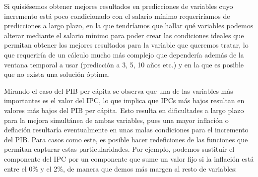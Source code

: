 \documentclass[11pt]{article}
\begin{document}
Si quisiésemos obtener mejores resultados en predicciones de variables
cuyo incremento está poco condicionado con el salario mínimo
requeriríamos de predicciones a largo plazo, en la que tendríamos que
hallar qué variables podemos alterar mediante el salario mínimo para
poder crear las condiciones ideales que permitan obtener los mejores
resultados para la variable que queremos tratar, lo que requeriría de un
cálculo mucho más complejo que dependería además de la ventana temporal
a usar (predicción a 3, 5, 10 años etc.) y en la que es posible que no
exista una solución óptima.

Mirando el caso del PIB per cápita se observa que una de las variables
más importantes es el valor del IPC, lo que implica que IPCs más bajos
resultan en valores más bajos del PIB per cápita. Esto resulta en
dificultades a largo plazo para la mejora simultánea de ambas variables,
pues una mayor inflación o deflación resultaría eventualmente en unas
malas condiciones para el incremento del PIB. Para casos como este, es
posible hacer redeficiones de las funciones que permitan capturar estas
particularidades. Por ejemplo, podemos sustituir el componente del IPC
por un componente que sume un valor fijo si la inflación está entre el
0\% y el 2\%, de manera que demos más margen al resto de variables:
\end{document}
